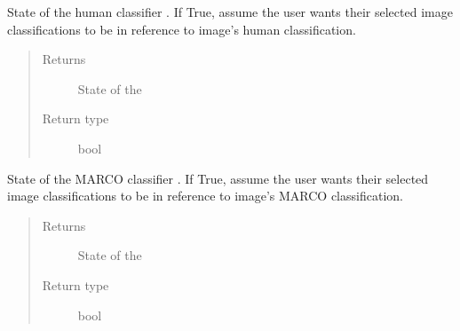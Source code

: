 \documentclass[letterpaper,10pt,english]{sphinxmanual}
\begin{document}
\begin{fulllineitems}
\begin{fulllineitems}
\begin{quote}
\begin{description}
\end{description}\end{quote}

\end{fulllineitems}


\begin{fulllineitems}
\label{\detokenize{polo.widgets:polo.widgets.slideshow_inspector.slideshowInspector.human}}
State of the human classifier . If True, assume the user
wants their selected image classifications to be in reference to image’s
human classification.
\begin{quote}\begin{description}
\item[{Returns}] \leavevmode
State of the 

\item[{Return type}] \leavevmode
bool

\end{description}\end{quote}

\end{fulllineitems}


\begin{fulllineitems}
\label{\detokenize{polo.widgets:polo.widgets.slideshow_inspector.slideshowInspector.marco}}
State of the MARCO classifier . If True, assume the user
wants their selected image classifications to be in reference to image’s
MARCO classification.
\begin{quote}\begin{description}
\item[{Returns}] \leavevmode
State of the 

\item[{Return type}] \leavevmode
bool


\end{description}
\end{quote}
\end{fulllineitems}
\end{fulllineitems}
\end{document}
